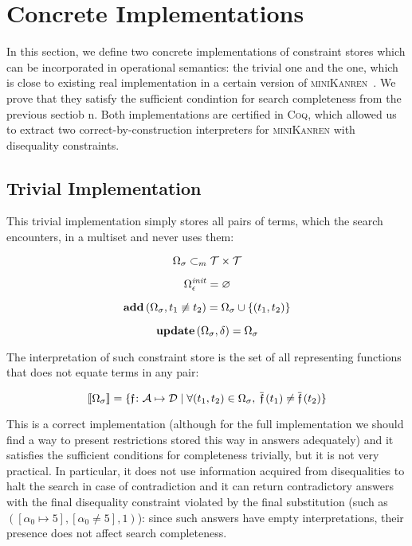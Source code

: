\section{Concrete Implementations}
\label{sec:implementations}

In this section, we define two concrete implementations of constraint stores which can be incorporated in operational semantics: the trivial one and the one, which is close to existing real implementation in a certain version of \textsc{miniKanren}~\cite{CKanren}. We prove that they satisfy the sufficient condintion for search completeness from the previous sectiob
n. Both implementations are certified in \textsc{Coq}, which allowed us to extract two correct-by-construction interpreters for \textsc{miniKanren} with
disequality constraints.

\subsection{Trivial Implementation}

This trivial implementation simply stores all pairs of terms, which the search encounters, in a multiset and never uses them:

\[ \Omega_\sigma \subset_m \mathcal{T} \times \mathcal{T} \]

\[ \Omega_\epsilon^{\mathit{init}} = \varnothing \]

\[ \mathbf{add}\,(\Omega_\sigma, t_1 \not\equiv t_2) = \Omega_\sigma \cup \{(t_1, t_2)\} \]

\[ \mathbf{update}\,(\Omega_\sigma, \delta) = \Omega_\sigma \]

The interpretation of such constraint store is the set of all representing functions that does not equate terms in any pair:

\[ \llbracket{\Omega_\sigma}\rrbracket = \{\mathfrak{f} \colon \mathcal{A}\mapsto\mathcal{D} \mid \forall (t_1, t_2) \in \Omega_\sigma, \; \overline{\mathfrak{f}}\,(t_1) \neq \overline{\mathfrak{f}}\,(t_2)\} \]

This is a correct implementation (although for the full implementation we should find a way to present restrictions stored this way
in answers adequately) and it satisfies the sufficient conditions for completeness trivially, but it is not very practical.
In particular, it does not use information acquired from disequalities to halt the search in case of contradiction and it can return contradictory answers with the final disequality constraint violated by the final substitution (such as $([\alpha_0 \mapsto 5], [\alpha_0 \neq 5], 1)$): since such answers have empty interpretations, their presence does not affect search completeness.

